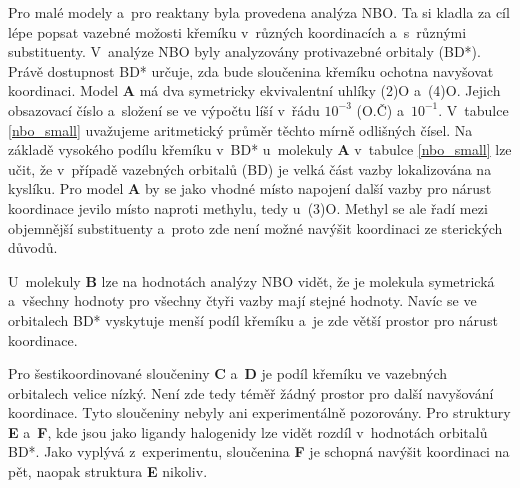 \documentclass[
digital, %
table,   %
lof,     %
lot,     %
oneside,
]{fithesis3}
\begin{document}
Pro malé modely a~pro reaktany byla provedena analýza NBO. Ta si kladla za cíl lépe popsat vazebné možosti křemíku v~různých koordinacích a~s~různými substituenty. V~analýze NBO byly analyzovány protivazebné orbitaly (BD*). Právě dostupnost BD* určuje, zda bude sloučenina křemíku ochotna navyšovat koordinaci. Model \textbf{A} má dva symetricky ekvivalentní uhlíky (2)O a~(4)O. Jejich obsazovací číslo a~složení se ve výpočtu líší v~řádu $10^{-3}$ (O.Č) a~$10^{-1}$. V~tabulce \ref{nbo_small} uvažujeme aritmetický průměr těchto mírně odlišných čísel. Na základě vysokého podílu křemíku v~BD* u~molekuly \textbf{A} v~tabulce \ref{nbo_small} lze učit, že v~případě vazebných orbitalů (BD) je velká část vazby lokalizována na kyslíku. Pro model \textbf{A} by se jako vhodné místo napojení další vazby pro nárust koordinace jevilo místo  naproti methylu, tedy u~(3)O. Methyl se ale řadí mezi objemnější substituenty a~proto zde není možné navýšit koordinaci ze sterických důvodů.

 U~molekuly \textbf{B} lze na hodnotách analýzy NBO vidět, že je molekula symetrická a~všechny hodnoty pro všechny čtyři vazby mají stejné hodnoty. Navíc se ve orbitalech BD* vyskytuje menší podíl křemíku a~je zde větší prostor pro nárust koordinace.

Pro šestikoordinované sloučeniny \textbf{C} a~\textbf{D} je podíl křemíku ve vazebných orbitalech velice nízký. Není zde tedy téměř žádný prostor pro další navyšování koordinace. Tyto sloučeniny nebyly ani experimentálně pozorovány. Pro struktury \textbf{E} a~\textbf{F}, kde jsou jako ligandy halogenidy lze vidět rozdíl v~hodnotách orbitalů BD*. Jako vyplývá z~experimentu, sloučenina \textbf{F} je schopná navýšit koordinaci na pět, naopak struktura \textbf{E} nikoliv.
\end{document}
